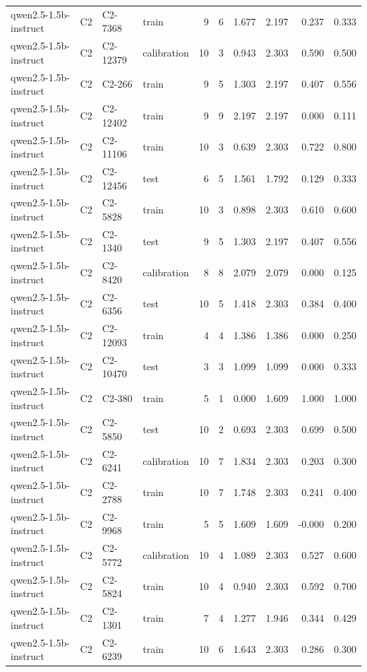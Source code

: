 \begin{table}
\begin{tabular}{llllrrrrrr}
qwen2.5-1.5b-instruct & C2 & C2-7368 & train & 9 & 6 & 1.677 & 2.197 & 0.237 & 0.333 \\
qwen2.5-1.5b-instruct & C2 & C2-12379 & calibration & 10 & 3 & 0.943 & 2.303 & 0.590 & 0.500 \\
qwen2.5-1.5b-instruct & C2 & C2-266 & train & 9 & 5 & 1.303 & 2.197 & 0.407 & 0.556 \\
qwen2.5-1.5b-instruct & C2 & C2-12402 & train & 9 & 9 & 2.197 & 2.197 & 0.000 & 0.111 \\
qwen2.5-1.5b-instruct & C2 & C2-11106 & train & 10 & 3 & 0.639 & 2.303 & 0.722 & 0.800 \\
qwen2.5-1.5b-instruct & C2 & C2-12456 & test & 6 & 5 & 1.561 & 1.792 & 0.129 & 0.333 \\
qwen2.5-1.5b-instruct & C2 & C2-5828 & train & 10 & 3 & 0.898 & 2.303 & 0.610 & 0.600 \\
qwen2.5-1.5b-instruct & C2 & C2-1340 & test & 9 & 5 & 1.303 & 2.197 & 0.407 & 0.556 \\
qwen2.5-1.5b-instruct & C2 & C2-8420 & calibration & 8 & 8 & 2.079 & 2.079 & 0.000 & 0.125 \\
qwen2.5-1.5b-instruct & C2 & C2-6356 & test & 10 & 5 & 1.418 & 2.303 & 0.384 & 0.400 \\
qwen2.5-1.5b-instruct & C2 & C2-12093 & train & 4 & 4 & 1.386 & 1.386 & 0.000 & 0.250 \\
qwen2.5-1.5b-instruct & C2 & C2-10470 & test & 3 & 3 & 1.099 & 1.099 & 0.000 & 0.333 \\
qwen2.5-1.5b-instruct & C2 & C2-380 & train & 5 & 1 & 0.000 & 1.609 & 1.000 & 1.000 \\
qwen2.5-1.5b-instruct & C2 & C2-5850 & test & 10 & 2 & 0.693 & 2.303 & 0.699 & 0.500 \\
qwen2.5-1.5b-instruct & C2 & C2-6241 & calibration & 10 & 7 & 1.834 & 2.303 & 0.203 & 0.300 \\
qwen2.5-1.5b-instruct & C2 & C2-2788 & train & 10 & 7 & 1.748 & 2.303 & 0.241 & 0.400 \\
qwen2.5-1.5b-instruct & C2 & C2-9968 & train & 5 & 5 & 1.609 & 1.609 & -0.000 & 0.200 \\
qwen2.5-1.5b-instruct & C2 & C2-5772 & calibration & 10 & 4 & 1.089 & 2.303 & 0.527 & 0.600 \\
qwen2.5-1.5b-instruct & C2 & C2-5824 & train & 10 & 4 & 0.940 & 2.303 & 0.592 & 0.700 \\
qwen2.5-1.5b-instruct & C2 & C2-1301 & train & 7 & 4 & 1.277 & 1.946 & 0.344 & 0.429 \\
qwen2.5-1.5b-instruct & C2 & C2-6239 & train & 10 & 6 & 1.643 & 2.303 & 0.286 & 0.300 \\

\end{tabular}
\end{table}
